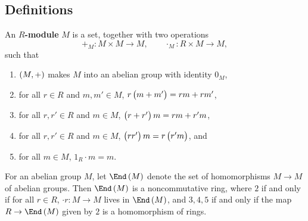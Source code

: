 \subsection{Definitions}


\begin{definition}
An \textbf{$ R $-module} $ M $ is a set, together with two operations
$$ +_M : M \times M \to M, \qquad \cdot_M : R \times M \to M, $$
such that
\begin{enumerate}
\item $ \br{M, +} $ makes $ M $ into an abelian group with identity $ 0_M $,
\item for all $ r \in R $ and $ m, m' \in M $, $ r\br{m + m'} = rm + rm' $,
\item for all $ r, r' \in R $ and $ m \in M $, $ \br{r + r'}m = rm + r'm $,
\item for all $ r, r' \in R $ and $ m \in M $, $ \br{rr'}m = r\br{r'm} $, and
\item for all $ m \in M $, $ 1_R \cdot m = m $.
\end{enumerate}
\end{definition}

\begin{note*}
For an abelian group $ M $, let $ \End\br{M} $ denote the set of homomorphisms $ M \to M $ of abelian groups. Then $ \End\br{M} $ is a noncommutative ring, where $ 2 $ if and only if for all $ r \in R $, $ \cdot r : M \to M $ lives in $ \End\br{M} $, and $ 3, 4, 5 $ if and only if the map $ R \to \End\br{M} $ given by $ 2 $ is a homomorphism of rings.
\end{note*}

